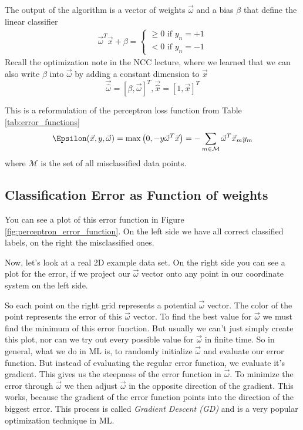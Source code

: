 The output of the algorithm is a vector of weights $\vec{\omega}$ and a bias $\beta$ that define the linear classifier
\begin{align}
  \vec{\omega}^T \vec{x} + \beta = \left\{\begin{matrix}
    \geq 0 \text{ if } y_n = +1\\
    < 0 \text{ if } y_n = -1
  \end{matrix}\right.
\end{align}
Recall the optimization note in the NCC lecture, where we learned that we can also write $\beta$ into $\vec{\omega}$ by adding a constant dimension to $\vec{x}$
\begin{equation}
  \vec{\hat{\omega}} = \left[\beta,\vec{\omega}\right]^T, \vec{\hat{x}} = \left[1, \vec{x}\right]^T
\end{equation}

This is a reformulation of the perceptron loss function from Table \ref{tab:error_functions}
\begin{equation}
  \Epsilon(\vec{x}, y, \vec{\omega}) = \max\left(0, -y \vec{\omega}^T \vec{x}\right) = -\sum_{m \in \mathcal{M}} \vec{\omega}^T \vec{x}_m y_m
\end{equation}
where $\mathcal{M}$ is the set of all misclassified data points.

\subsection{Classification Error as Function of weights}
You can see a plot of this error function in Figure \ref{fig:perceptron_error_function}. On the left side we have all correct classified labels, on the right the misclassified ones.

Now, let's look at a real 2D example data set. On the right side you can see a plot for the error, if we project our $\vec{\omega}$ vector onto any point in our coordinate system on the left side.

So each point on the right grid represents a potential $\vec{\omega}$ vector. The color of the point represents the error of this $\vec{\omega}$ vector.
To find the best value for $\vec{\omega}$ we must find the minimum of this error function. But usually we can't just simply create this plot, nor can we try out every possible value for $\vec{\omega}$ in finite time.
So in general, what we do in ML is, to randomly initialize $\vec{\omega}$ and evaluate our error function. But instead of evaluating the regular error function, we evaluate it's gradient.
This gives us the steepness of the error function in $\vec{\omega}$. To minimize the error through $\vec{\omega}$ we then adjust $\vec{\omega}$ in the opposite direction of the gradient.
This works, because the gradient of the error function points into the direction of the biggest error.
This process is called \textit{Gradient Descent (GD)} and is a very popular optimization technique in ML.
